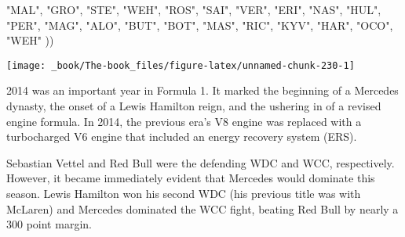 \documentclass[
]{book}
\newenvironment{Shaded}{\begin{snugshade}}{\end{snugshade}}
\newcommand{\NormalTok}[1]{#1}
\newcommand{\StringTok}[1]{\textcolor[rgb]{0.31,0.60,0.02}{#1}}
\begin{document}
\begin{Shaded}
\begin{Highlighting}[]
                                \StringTok{"MAL"}\NormalTok{, }\StringTok{"GRO"}\NormalTok{,}
                                \StringTok{"STE"}\NormalTok{, }\StringTok{"WEH"}\NormalTok{, }\StringTok{"ROS"}\NormalTok{,}
                                \StringTok{"SAI"}\NormalTok{, }\StringTok{"VER"}\NormalTok{,}
                                \StringTok{"ERI"}\NormalTok{, }\StringTok{"NAS"}\NormalTok{, }
                                \StringTok{"HUL"}\NormalTok{, }\StringTok{"PER"}\NormalTok{,  }
                                \StringTok{"MAG"}\NormalTok{, }\StringTok{"ALO"}\NormalTok{, }\StringTok{"BUT"}\NormalTok{,}
                                \StringTok{"BOT"}\NormalTok{, }\StringTok{"MAS"}\NormalTok{,}
                                \StringTok{"RIC"}\NormalTok{, }\StringTok{"KYV"}\NormalTok{,}
                                \StringTok{"HAR"}\NormalTok{, }\StringTok{"OCO"}\NormalTok{, }\StringTok{"WEH"}
\NormalTok{                                )) }
\end{Highlighting}
\end{Shaded}

\begin{center}\texttt{[image: \_book/The-book\_files/figure-latex/unnamed-chunk-230-1]} \end{center}

2014 was an important year in Formula 1. It marked the beginning of a Mercedes dynasty, the onset of a Lewis Hamilton reign, and the ushering in of a revised engine formula. In 2014, the previous era's V8 engine was replaced with a turbocharged V6 engine that included an energy recovery system (ERS).

Sebastian Vettel and Red Bull were the defending WDC and WCC, respectively. However, it became immediately evident that Mercedes would dominate this season. Lewis Hamilton won his second WDC (his previous title was with McLaren) and Mercedes dominated the WCC fight, beating Red Bull by nearly a 300 point margin.
\end{document}
